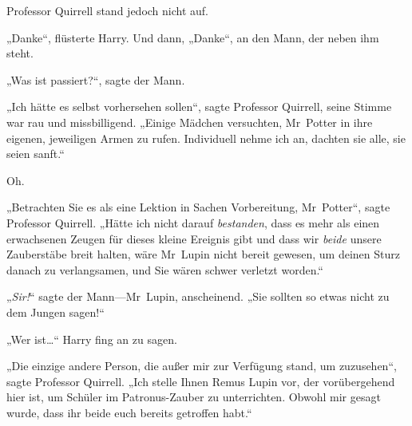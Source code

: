 Professor Quirrell stand jedoch nicht auf.

„Danke“, flüsterte Harry. Und dann, „Danke“, an den Mann, der neben ihm steht.

„Was ist passiert?“, sagte der Mann.

„Ich hätte es selbst vorhersehen sollen“, sagte Professor Quirrell, seine Stimme war rau und missbilligend. „Einige Mädchen versuchten, Mr~Potter in ihre eigenen, jeweiligen Armen zu rufen. Individuell nehme ich an, dachten sie alle, sie seien sanft.“

Oh.

„Betrachten Sie es als eine Lektion in Sachen Vorbereitung, Mr~Potter“, sagte Professor Quirrell. „Hätte ich nicht darauf \emph{bestanden}, dass es mehr als einen erwachsenen Zeugen für dieses kleine Ereignis gibt und dass wir \emph{beide} unsere Zauberstäbe breit halten, wäre Mr~Lupin nicht bereit gewesen, um deinen Sturz danach zu verlangsamen, und Sie wären schwer verletzt worden.“

„\emph{Sir!}“ sagte der Mann—Mr~Lupin, anscheinend. „Sie sollten so etwas nicht zu dem Jungen sagen!“

„Wer ist…“ Harry fing an zu sagen.

„Die einzige andere Person, die außer mir zur Verfügung stand, um zuzusehen“, sagte Professor Quirrell. „Ich stelle Ihnen Remus Lupin vor, der vorübergehend hier ist, um Schüler im Patronus-Zauber zu unterrichten. Obwohl mir gesagt wurde, dass ihr beide euch bereits getroffen habt.“

